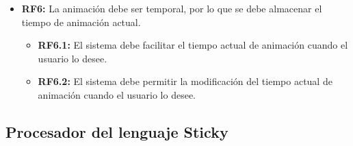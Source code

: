 \begin{itemize}
         \item \textbf{RF6:} La animación debe ser temporal, por lo que se debe almacenar el tiempo de animación actual.
               \begin{itemize}
                  \item \textbf{RF6.1:} El sistema debe facilitar el tiempo actual de animación cuando el usuario lo desee.
                  \item \textbf{RF6.2:} El sistema debe permitir la modificación del tiempo actual de animación cuando el usuario lo desee.
               \end{itemize}
         \end{itemize}

      \subsection{Procesador del lenguaje Sticky}
